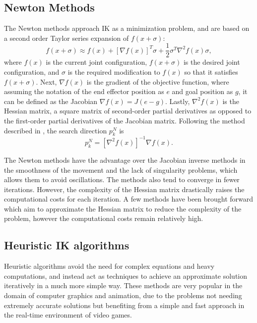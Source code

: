\subsection{Newton Methods}
The Newton methods approach IK as a minimization problem, and are based on
a second order Taylor series expansion of \(f(x + \sigma)\):
\begin{equation}
    f(x + \sigma) \approx f(x) + [\nabla f(x)]^T \sigma + \frac{1}{2} \sigma^T
    \nabla^2 f(x) \sigma,
\end{equation}
where \(f(x)\) is the current joint configuration, \(f(x + \sigma)\)
is the desired joint configuration, and \(\sigma\) is the required modification
to \(f(x)\) so that it satisfies \(f(x + \sigma)\). Next, \(\nabla f(x)\) is
the gradient of the objective function, where assuming the notation of the end
effector position as \(e\) and goal position as \(g\), it can be defined as the
Jacobian \(\nabla f(x) = J(e - g)\). Lastly, \(\nabla^2 f(x)\) is the Hessian
matrix, a square matrix of second-order partial derivatives as opposed to the
first-order partial derivatives of the Jacobian matrix. Following the method
described in \cite{nocedal_newton}, the search direction \(p^N_k\) is
\begin{equation}
    p^N_k = [\nabla^2 f(x)]^{-1} \nabla f(x).
\end{equation}

The Newton methods have the advantage over the Jacobian inverse methods in the
smoothness of the movement and the lack of singularity problems, which allows
them to avoid oscillations. The methods also tend to converge
in fewer iterations. However, the complexity of the Hessian matrix drastically
raises the computational costs for each iteration. A few methods have been
brought forward which aim to approximate the Hessian matrix to reduce the
complexity of the problem, however the computational costs remain relatively
high. 

\subsection{Heuristic IK algorithms}
Heuristic algorithms avoid the need for complex equations and heavy
computations, and instead act as techniques to achieve an approximate solution
iteratively in a much more simple way. These methods are very popular in the
domain of computer graphics and animation, due to the problems not needing
extremely accurate solutions but benefiting from a simple and fast approach in
the real-time environment of video games. \\

